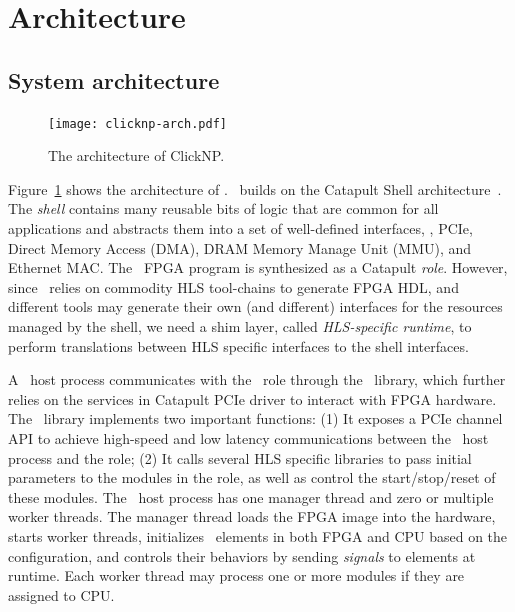 \section{Architecture}
\label{clicknp:sec:architecture}

\subsection{System architecture}
\label{clicknp:subsec:sysarch}

\begin{figure}
\centering
\texttt{[image: clicknp-arch.pdf]}

\caption{The architecture of ClickNP.}
\label{clicknp:fig:clicknp}

\end{figure}

Figure~\ref{clicknp:fig:clicknp} shows the architecture of \name.
\name\ builds on the Catapult Shell architecture~\cite{putnam2014reconfigurable}.
The \textit{shell} contains many reusable bits of logic that are common for all applications 
and abstracts them into a set of well-defined interfaces,
\eg, PCIe, Direct Memory Access (DMA), DRAM Memory Manage Unit (MMU), 
and Ethernet MAC.
%
The \name\ FPGA program is synthesized as a Catapult \textit{role}.
%
However, since \name\ relies on commodity HLS tool-chains to generate FPGA HDL, 
and different tools may generate their own (and different) interfaces for the resources managed by the shell, 
we need a shim layer, called \textit{HLS-specific runtime}, to perform
translations between HLS specific interfaces to the shell interfaces. 

A \name\ host process communicates with the \name\ role through the \name\ library,
which further relies on the services in Catapult PCIe driver 
to interact with FPGA hardware.
The \name\ library implements two important functions: 
(1) It exposes a PCIe channel API to achieve high-speed and low latency communications 
between the \name\ host process and the role; 
(2) It calls several HLS specific libraries to pass initial parameters to
the modules in the role, as well as control the start/stop/reset of these 
modules.
%
The \name\ host process has one manager thread and zero or multiple 
worker threads.
%
The manager thread loads the FPGA image into the hardware, starts worker threads, 
initializes \name\ elements in both FPGA and CPU based on the configuration, 
and controls their behaviors by sending \textit{signals} to elements 
at runtime. 
%
Each worker thread may process one or more modules if they are assigned to CPU.

